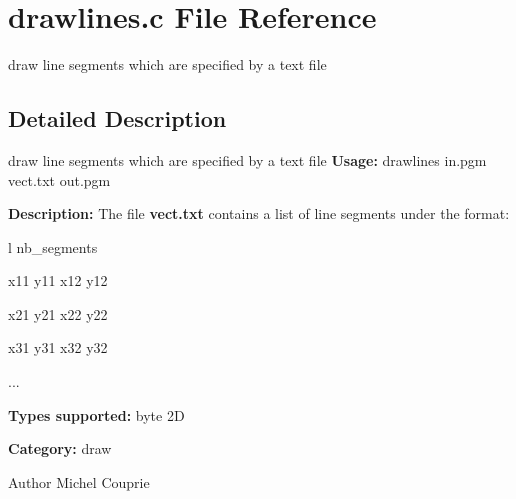 \section{drawlines.c File Reference}
\label{drawlines_8c}


draw line segments which are specified by a text file  




\subsection{Detailed Description}
draw line segments which are specified by a text file {\bfseries Usage:} drawlines in.pgm vect.txt out.pgm

{\bfseries Description:} The file {\bfseries vect.txt} contains a list of line segments under the format:\par
 l nb\_\-segments\par
 x11 y11 x12 y12\par
 x21 y21 x22 y22\par
 x31 y31 x32 y32\par
 ...\par


{\bfseries Types supported:} byte 2D

{\bfseries Category:} draw

\begin{DoxyAuthor}{Author}
Michel Couprie 
\end{DoxyAuthor}
